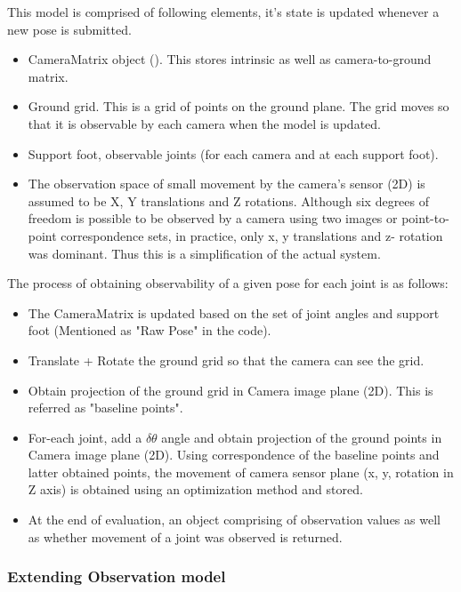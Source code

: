 \documentclass[english, printversion, nomenclature, notitle]{tuvisionthesis} %
\begin{document}
This model is comprised of following elements, it's state is updated whenever a new pose is submitted.
\begin{itemize}
	\item CameraMatrix object ().
	\subitem This stores intrinsic as well as camera-to-ground matrix.
	\item Ground grid. This is a grid of points on the ground plane.
	\subitem The grid moves so that it is observable by each camera when the model is updated.
	\item Support foot, observable joints (for each camera and at each support foot). 
	\item The observation space of small movement by the camera's sensor (2D) is assumed to be X, Y translations and Z rotations.
	\subitem Although six degrees of freedom is possible to be observed by a camera using two images or point-to-point correspondence sets, in practice, only x, y translations and z- rotation was dominant.  Thus this is a simplification of the actual system.
\end{itemize}

The process of obtaining observability of a given pose for each joint is as follows: 
\begin{itemize}
	\item The CameraMatrix is updated based on the set of joint angles and support foot (Mentioned as "Raw Pose" in the code).
	\item Translate + Rotate the ground grid so that the camera can see the grid.
	\item Obtain projection of the ground grid in Camera image plane (2D). This is referred as "baseline points".
	\item For-each joint, add a \(\delta\theta\) angle and obtain projection of the ground points in Camera image plane (2D).
	\subitem Using correspondence of the baseline points and latter obtained points, the movement of camera sensor plane (x, y, rotation in Z axis) is obtained using an optimization method and stored.
	\item At the end of evaluation, an object comprising of observation values as well as whether movement of a joint was observed is returned.
\end{itemize}


\subsubsection{Extending Observation model}
\end{document}
